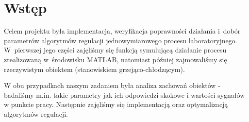 \chapter{Wstęp}

Celem projektu była implementacja, weryfikacja poprawności działania i~dobór parametrów algorytmów regulacji jednowymiarowego procesu laboratoryjnego. W~pierwszej jego części zajęliśmy się funkcją symulującą działanie procesu zrealizowaną w~środowisku MATLAB, natomiast później zajmowaliśmy się rzeczywistym obiektem (stanowiskiem grzejąco-chłodzącym).

W obu przypadkach naszym zadaniem była analiza zachowań obiektów - badaliśmy m.in. takie parametry jak ich odpowiedzi skokowe i wartości sygnałów w punkcie pracy. Następnie zajęliśmy się implementacją oraz optymalizacją algorytmów regulacji.